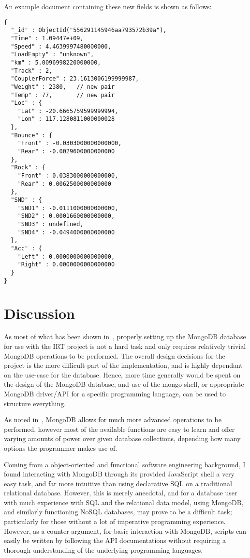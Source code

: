 \documentclass[a4paper,11pt]{article}
\begin{document}
An example document containing these new fields is shown as follows:

\begin{lstlisting}[caption=Example of a document with extra sensor fields that do not exist in original dataset.]
{
  "_id" : ObjectId("556291145946aa793572b39a"),
  "Time" : 1.09447e+09,
  "Speed" : 4.4639997480000000,
  "LoadEmpty" : "unknown",
  "km" : 5.0096998220000000,
  "Track" : 2,
  "CouplerForce" : 23.1613006199999987,
  "Weight" : 2380,   // new pair
  "Temp" : 77,       // new pair
  "Loc" : {
    "Lat" : -20.6665759599999994,
    "Lon" : 117.1280811000000028
  },
  "Bounce" : {
    "Front" : -0.0303000000000000,
    "Rear" : -0.0029600000000000
  },
  "Rock" : {
    "Front" : 0.0383000000000000,
    "Rear" : 0.0062500000000000
  },
  "SND" : {
    "SND1" : -0.0111000000000000,
    "SND2" : 0.0001660000000000,
    "SND3" : undefined,
    "SND4" : -0.0494000000000000
  },
  "Acc" : {
    "Left" : 0.0000000000000000,
    "Right" : 0.0000000000000000
  }
}
\end{lstlisting}




\newpage

\section{Discussion} %
\label{sec:discussion}

As most of what has been shown in~, properly setting up the MongoDB database for use with the IRT
project is not a hard task and only requires relatively trivial MongoDB operations to be performed. The overall design
decisions for the project is the more difficult part of the implementation, and is highly dependant on the use-case
for the database. Hence, more time generally would be spent on the design of the MongoDB database, and use of the
mongo shell, or appropriate MongoDB driver/API for a specific programming language, can be used to structure everything.

As noted in~, MongoDB allows for much more advanced operations to be performed, however
most of the available functions are easy to learn and offer varying amounts of power over given database collections,
depending how many options the programmer makes use of.

Coming from a object-oriented and functional software engineering background, I found interacting with MongoDB through its provided JavaScript shell
a very easy task, and far more intuitive than using declarative SQL on a traditional relational database. However, this is merely
anecdotal, and for a database user with much experience with SQL and the relational data model, using MongoDB, and
similarly functioning NoSQL databases, may prove to be a difficult task; particularly for those without a lot of imperative programming
experience. However, as a counter-argument, for basic interaction with MongoDB, scripts can easily be written by
following the API documentations without requiring a thorough understanding of the underlying programming languages.
\end{document}
